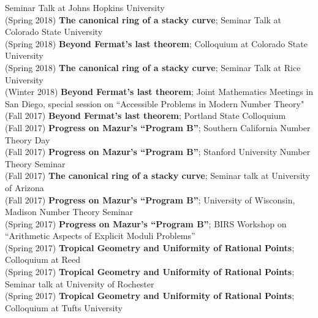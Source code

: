 \documentclass[margin,line]{res}
\begin{document}
\begin{resume}
Seminar Talk at Johns Hopkins University
\\
(Spring 2018) \textbf{The canonical ring of a stacky curve};  
Seminar Talk at Colorado State University
\\
(Spring 2018) \textbf{Beyond Fermat's last theorem};
Colloquium at Colorado State University 
\vspace{.05cm}\\
(Spring 2018) \textbf{The canonical ring of a stacky curve};  
Seminar Talk at Rice University
\vspace{.05cm}\\
(Winter 2018) \textbf{Beyond Fermat's last theorem};
Joint Mathematics Meetings in San Diego, special session on ``Accessible Problems in Modern Number Theory" 
\vspace{.05cm}\\
(Fall 2017) \textbf{Beyond Fermat's last theorem};
Portland State Colloquium
\vspace{.05cm}\\
(Fall 2017) \textbf{Progress on Mazur's ``Program B''};  
Southern California Number Theory Day
\vspace{.05cm}\\
(Fall 2017) \textbf{Progress on Mazur's ``Program B''};  
Stanford University Number Theory Seminar
\vspace{.05cm}\\
(Fall 2017) \textbf{The canonical ring of a stacky curve};  
Seminar talk at University of Arizona
\vspace{.05cm}\\
(Fall 2017) \textbf{Progress on Mazur's ``Program B''};  
University of Wisconsin, Madison Number Theory Seminar
\vspace{.05cm}\\
(Spring 2017) \textbf{Progress on Mazur's ``Program B''};  
BIRS Workshop on ``Arithmetic Aspects of Explicit Moduli Problems''
\vspace{.05cm}\\
(Spring 2017) \textbf{Tropical Geometry and Uniformity of Rational Points};
Colloquium at Reed 
\vspace{.05cm}\\
(Spring 2017) \textbf{Tropical Geometry and Uniformity of Rational Points};
Seminar talk at University of Rochester
\vspace{.05cm}\\
(Spring 2017) \textbf{Tropical Geometry and Uniformity of Rational Points};
Colloquium at Tufts University 
\vspace{.05cm}\\

\end{resume}
\end{document}
